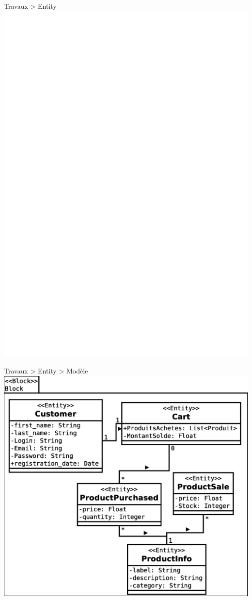 \documentclass[HeilHazel,pdf,final,colorBG,slideColor]{prosper}
\begin{document}
\begin{slide}{Travaux > Entity}
  \bc{}
    \includegraphics[scale=.4]{img/Entity.eps} 
  \ec{}
\end{slide}

\begin{slide}{Travaux > Entity > Modèle}
  \bc{}
    \includegraphics[scale=.33]{img/entity_model.eps} 
  \ec{}
\end{slide}
\end{document}
